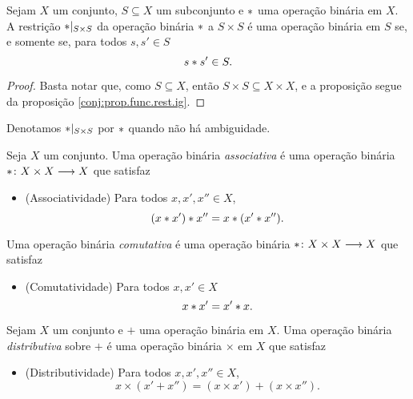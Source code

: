 \begin{proposition}
\label{prop:restri.op.bin}
Sejam $X$ um conjunto, $S \subseteq X$ um subconjunto e $\ast$ uma operação binária em $X$. A restrição $\ast|_{S \times S}$ da operação binária $\ast$ a $S \times S$ é uma operação binária em $S$ se, e somente se, para todos $s,s' \in S$
	\begin{equation*}
	s \ast s' \in S.
	\end{equation*}
\end{proposition}
\begin{proof}
Basta notar que, como $S \subseteq X$, então $S \times S \subseteq X \times X$, e a proposição segue da proposição \ref{conj:prop.func.rest.ig}.
\end{proof}

Denotamos $\ast |_{S \times S}$ por $\ast$ quando não há ambiguidade.

\begin{definition}
Seja $X$ um conjunto. Uma operação binária \emph{associativa} é uma operação binária ${\ast}\colon {X \times X} \longrightarrow {X}$ que satisfaz
	\begin{itemize}
	\item (Associatividade) Para todos $x,x',x'' \in X$,
		\begin{equation*}
		(x \ast x') \ast x'' = x \ast (x' \ast x'').
		\end{equation*}
	\end{itemize}
Uma operação binária \emph{comutativa} é uma operação binária ${\ast}\colon {X \times X} \longrightarrow {X}$ que satisfaz
	\begin{itemize}
	\item (Comutatividade) Para todos $x,x' \in X$
		\begin{equation*}
		x \ast x' = x' \ast x.
		\end{equation*}
	\end{itemize}
\end{definition}

\begin{definition}
Sejam $X$ um conjunto e $+$ uma operação binária em $X$. Uma operação binária \emph{distributiva} sobre $+$ é uma operação binária $\times$ em $X$ que satisfaz
	\begin{itemize}
	\item (Distributividade) Para todos $x,x',x'' \in X$,
	\begin{equation*}
	x \times (x' + x'') = (x \times x') + (x \times x'').
	\end{equation*}
	\end{itemize}
\end{definition}

